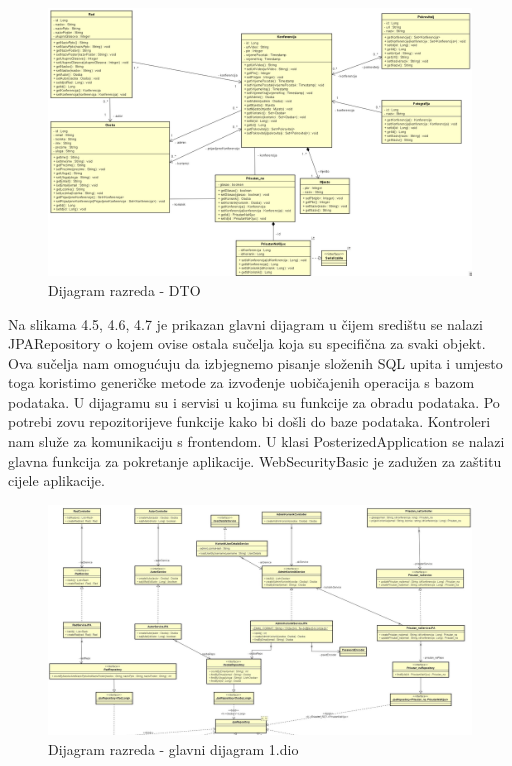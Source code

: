 			\begin{figure}[H]
				\includegraphics[scale=0.4]{dijagrami/dto_klase.png}%
				\centering
				\caption{Dijagram razreda - DTO}
				\label{fig:promjena9}
			\end{figure}
			

			Na slikama 4.5, 4.6, 4.7 je prikazan glavni dijagram u čijem središtu se nalazi JPARepository o kojem ovise ostala sučelja koja su specifična za svaki objekt. Ova sučelja nam omogućuju da izbjegnemo pisanje složenih SQL upita i umjesto toga koristimo generičke metode za izvođenje uobičajenih operacija s bazom podataka.
U dijagramu su i servisi u kojima su funkcije za obradu podataka. Po potrebi zovu repozitorijeve funkcije kako bi došli do baze podataka.
Kontroleri nam služe za komunikaciju s frontendom. 
U klasi PosterizedApplication se nalazi glavna funkcija za pokretanje aplikacije. WebSecurityBasic je zadužen za zaštitu cijele aplikacije.

			

			\begin{figure}[H]
				\includegraphics[scale=0.23]{dijagrami/glavni_1.JPG}%
				\centering
				\caption{Dijagram razreda - glavni dijagram 1.dio}
				\label{fig:promjena9.1}
			\end{figure}
			
